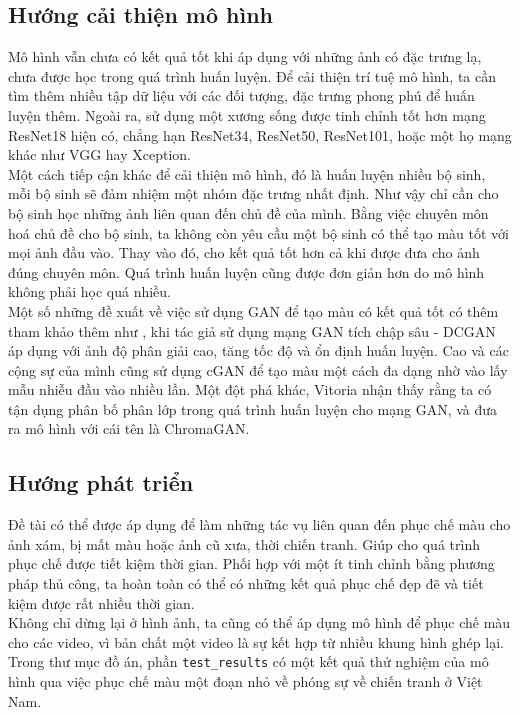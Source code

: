 \documentclass[a4paper, 12pt]{article}
\begin{document}
\subsection{Hướng cải thiện mô hình}

Mô hình vẫn chưa có kết quả tốt khi áp dụng với những ảnh có đặc trưng lạ, chưa được học trong quá trình huấn luyện. Để cải thiện trí tuệ mô hình, ta cần tìm thêm nhiều tập dữ liệu với các đối tượng, đặc trưng phong phú để huấn luyện thêm. Ngoài ra, sử dụng một xương sống được tinh chỉnh tốt hơn mạng ResNet18 hiện có, chẳng hạn ResNet34, ResNet50, ResNet101, hoặc một họ mạng khác như VGG hay Xception.\vspace{5pt}\\
Một cách tiếp cận khác để cải thiện mô hình, đó là huấn luyện nhiều bộ sinh, mỗi bộ sinh sẽ đảm nhiệm một nhóm đặc trưng nhất định. Như vậy chỉ cần cho bộ sinh học những ảnh liên quan đến chủ đề của mình. Bằng việc chuyên môn hoá chủ đề cho bộ sinh, ta không còn yêu cầu một bộ sinh có thể tạo màu tốt với mọi ảnh đầu vào. Thay vào đó, cho kết quả tốt hơn cả khi được đưa cho ảnh đúng chuyên môn. Quá trình huấn luyện cũng được đơn giản hơn do mô hình không phải học quá nhiều.\vspace{5pt}\\
Một số những đề xuất về việc sử dụng GAN để tạo màu có kết quả tốt có thêm tham khảo thêm như \cite{Nazeri_2018}, khi tác giả sử dụng mạng GAN tích chập sâu - DCGAN áp dụng với ảnh độ phân giải cao, tăng tốc độ và ổn định huấn luyện. Cao và các cộng sự của mình \cite{cao2017unsupervised} cũng sử dụng cGAN để tạo màu một cách đa dạng nhờ vào lấy mẫu nhiễu đầu vào nhiều lần. Một đột phá khác, Vitoria \cite{vitoria2020chromagan} nhận thấy rằng ta có tận dụng phân bố phân lớp trong quá trình huấn luyện cho mạng GAN, và đưa ra mô hình với cái tên là ChromaGAN.

\subsection{Hướng phát triển}
Đề tài có thể được áp dụng để làm những tác vụ liên quan đến phục chế màu cho ảnh xám, bị mất màu hoặc ảnh cũ xưa, thời chiến tranh. Giúp cho quá trình phục chế được tiết kiệm thời gian. Phối hợp với một ít tinh chỉnh bằng phương pháp thủ công, ta hoàn toàn có thể có những kết quả phục chế đẹp đẽ và tiết kiệm được rất nhiều thời gian.\vspace{5pt}\\
Không chỉ dừng lại ở hình ảnh, ta cũng có thể áp dụng mô hình để phục chế màu cho các video, vì bản chất một video là sự kết hợp từ nhiều khung hình ghép lại. Trong thư mục đồ án, phần \texttt{test\_results} có một kết quả thử nghiệm của mô hình qua việc phục chế màu một đoạn nhỏ về phóng sự về chiến tranh ở Việt Nam.
\end{document}
